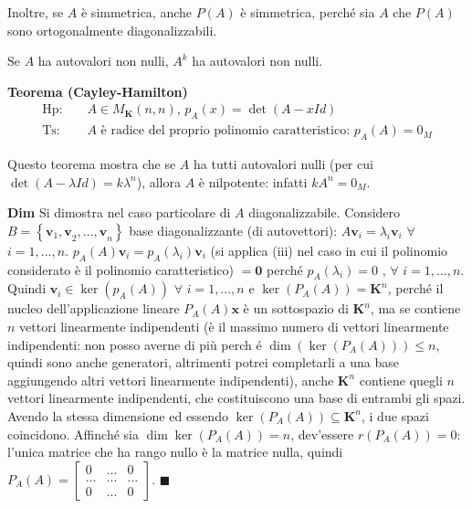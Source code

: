 \documentclass{article}
\begin{document}
Inoltre, se $A$ \`{e} simmetrica, anche $P\left( A\right) $ \`{e}
simmetrica, perch\'{e} sia $A$ che $P\left( A\right) $ sono ortogonalmente
diagonalizzabili.

Se $A$ ha autovalori non nulli, $A^{k}$ ha autovalori non nulli.

\textbf{Teorema (Cayley-Hamilton)}%
\begin{eqnarray*}
\text{Hp}\text{: } &&A\in M_{\mathbf{K}}\left( n,n\right) \text{, }%
p_{A}\left( x\right) =\det \left( A-xId\right)  \\
\text{Ts}\text{: } &&A\text{ \`{e} radice del proprio polinomio
caratteristico: }p_{A}\left( A\right) =0_{M}
\end{eqnarray*}

Questo teorema mostra che se $A$ ha tutti autovalori nulli (per cui $\det
\left( A-\lambda Id\right) =k\lambda ^{n}$), allora $A$ \`{e} nilpotente:
infatti $kA^{n}=0_{M}$.

\textbf{Dim} Si dimostra nel caso particolare di $A$ diagonalizzabile.
Considero $B=\left\{ \mathbf{v}_{1}\mathbf{,v}_{2}\mathbf{,...,v}%
_{n}\right\} $ base diagonalizzante (di autovettori): $A\mathbf{v}%
_{i}=\lambda _{i}\mathbf{v}_{i}$ $\forall $ $i=1,...,n$. $p_{A}\left(
A\right) \mathbf{v}_{i}=p_{A}\left( \lambda _{i}\right) \mathbf{v}_{i}$ (si
applica (iii) nel caso in cui il polinomio considerato \`{e} il polinomio
caratteristico) $=\mathbf{0}$ perch\'{e} $p_{A}\left( \lambda _{i}\right) =0$%
, $\forall $ $i=1,...,n$. Quindi $\mathbf{v}_{i}\in \ker \left( p_{A}\left(
A\right) \right) $ $\forall $ $i=1,...,n$ e $\ker \left( P_{A}\left(
A\right) \right) =\mathbf{K}^{n}$, perch\'{e} il nucleo dell'applicazione
lineare $P_{A}\left( A\right) \mathbf{x}$ \`{e} un sottospazio di $\mathbf{K}%
^{n}$, ma se contiene $n$ vettori linearmente indipendenti (\`{e} il massimo
numero di vettori linearmente indipendenti: non posso averne di pi\`{u} perch%
\'{e} $\dim \left( \ker \left( P_{A}\left( A\right) \right) \right) \leq n$,
quindi sono anche generatori, altrimenti potrei completarli a una base
aggiungendo altri vettori linearmente indipendenti), anche $\mathbf{K}^{n}$
contiene quegli $n$ vettori linearmente indipendenti, che costituiscono una
base di entrambi gli spazi. Avendo la stessa dimensione ed essendo $\ker
\left( P_{A}\left( A\right) \right) \subseteq \mathbf{K}^{n}$, i due spazi
coincidono. Affinch\'{e} sia $\dim \ker \left( P_{A}\left( A\right) \right)
=n$, dev'essere $r\left( P_{A}\left( A\right) \right) =0$: l'unica matrice
che ha rango nullo \`{e} la matrice nulla, quindi $P_{A}\left( A\right) =%
\left[ 
\begin{array}{ccc}
0 & ... & 0 \\ 
... & ... & ... \\ 
0 & ... & 0%
\end{array}%
\right] $. $\blacksquare $
\end{document}
